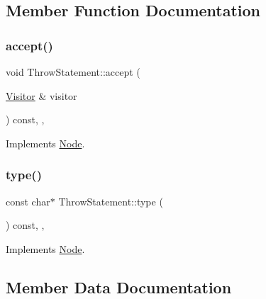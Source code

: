 \subsection{Member Function Documentation}
\mbox{\label{struct_throw_statement_a867eb5afd44e7a7dca0887143a42162a}} 
\subsubsection{\texorpdfstring{accept()}{accept()}}
{\footnotesize\ttfamily void Throw\+Statement\+::accept (\begin{DoxyParamCaption}\item[{\hyperlink{struct_visitor}{Visitor} \&}]{visitor }\end{DoxyParamCaption}) const\hspace{0.3cm}{\ttfamily [inline]}, {\ttfamily [override]}, {\ttfamily [virtual]}}



Implements \hyperlink{struct_node_a10bd7af968140bbf5fa461298a969c71}{Node}.

\mbox{\label{struct_throw_statement_a9e5f00ea3855830711544b28c575b11b}} 
\subsubsection{\texorpdfstring{type()}{type()}}
{\footnotesize\ttfamily const char$\ast$ Throw\+Statement\+::type (\begin{DoxyParamCaption}{ }\end{DoxyParamCaption}) const\hspace{0.3cm}{\ttfamily [inline]}, {\ttfamily [override]}, {\ttfamily [virtual]}}



Implements \hyperlink{struct_node_a82f29420d0a38efcc370352528e94e9b}{Node}.



\subsection{Member Data Documentation}
\mbox{\label{struct_throw_statement_a87b057f38ecbe03a687dec1204a7387a}} 
